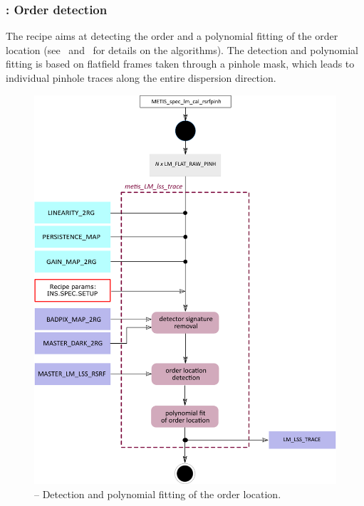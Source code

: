 \subsubsection{:  Order detection}\label{rec:metis_lm_lss_trace}
The recipe  aims at detecting the order and a polynomial fitting of the order location (see~\cite{pis02} and~\cite{pis21} for details on the algorithms). The detection and polynomial fitting is based on flatfield frames taken through a pinhole mask, which leads to individual pinhole traces along the entire dispersion direction.

\begin{figure}[ht]
  \centering
  \includegraphics[width=0.5\textheight]{figures/metis_lm_lss_trace_v0.83.pdf}
  \caption[Recipe: ]{ --
    Detection and polynomial fitting of the order location.}
  \label{Fig:rec_lm_lss_wtrace}
\end{figure}

